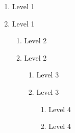 \documentclass[a4paper, article, uplatex, dvipdfmx]{jlreq}
\begin{document}
\begin{enumerate}
    \item Level 1
    \item Level 1
    \begin{enumerate}
        \item Level 2
        \item Level 2
        \begin{enumerate}
            \item Level 3
            \item Level 3
            \begin{enumerate}
                \item Level 4
                \item Level 4
            \end{enumerate}
        \end{enumerate}
    \end{enumerate}
\end{enumerate}
\end{document}
